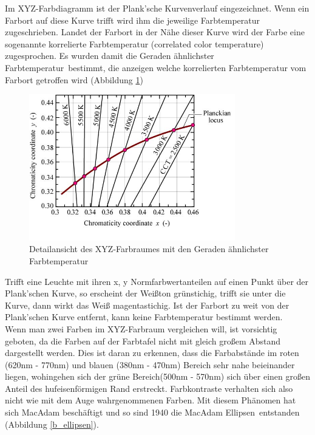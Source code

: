
\noindent Im XYZ-Farbdiagramm ist der Plank'sche Kurvenverlauf eingezeichnet. Wenn ein Farbort auf diese Kurve trifft wird ihm die jeweilige Farbtemperatur zugeschrieben. Landet der Farbort in der Nähe dieser Kurve wird der Farbe eine sogenannte korrelierte Farbtemperatur (correlated color temperature) zugesprochen. Es wurden damit die \glqq Geraden ähnlichster Farbtemperatur\grqq\ bestimmt, die anzeigen welche korrelierten Farbtemperatur vom Farbort getroffen wird (Abbildung \ref{b_cct})    

\begin{figure}[H]     %
\centering
\includegraphics[width=0.8\textwidth]{bilder/cct} 
\caption {Detailansicht des XYZ-Farbraumes mit den \glqq Geraden ähnlichster Farbtemperatur\grqq\ \protect\footnotemark}\label{b_cct}
\end{figure}


\noindent Trifft eine Leuchte mit ihren x, y Normfarbwertanteilen auf einen Punkt über der Plank'schen Kurve, so erscheint der Weißton grünstichig, trifft sie unter die Kurve, dann wirkt das Weiß magentastichig. Ist der Farbort zu weit von der Plank'schen Kurve entfernt, kann keine Farbtemperatur bestimmt werden.\\
Wenn man zwei Farben im XYZ-Farbraum vergleichen will, ist vorsichtig geboten, da die Farben auf der Farbtafel nicht mit gleich großem Abstand dargestellt werden. Dies ist daran zu erkennen, dass die Farbabstände im roten (620nm - 770nm) und blauen (380nm - 470nm) Bereich sehr nahe beieinander liegen, wohingehen sich der grüne Bereich(500nm - 570nm) sich über einen großen Anteil des hufeisenförmigen Rand erstreckt. Farbkontraste verhalten sich also nicht wie mit dem Auge wahrgenommenen Farben. Mit diesem Phänomen hat sich MacAdam beschäftigt und so sind 1940 die \glqq MacAdam Ellipsen\grqq\ entstanden (Abbildung \ref{b_ellipsen}).


